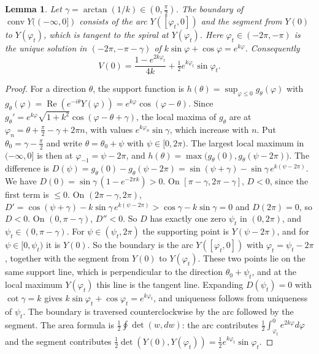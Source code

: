 \documentclass[11pt]{amsart}
\newtheorem{lemma}[theorem]{Lemma}
\theoremstyle{definition}
\newcommand{\conv}{\operatorname{conv}}
\newcommand{\re}{\operatorname{Re}}
\begin{document}
\begin{lemma}\label{lem:spiral}
Let $\gamma=\arctan(1/k)\in(0,\frac\pi2)$. The boundary of $\conv Y((-\infty,0])$ consists of the arc $Y([\varphi_t,0])$ and the segment from $Y(0)$ to $Y(\varphi_t)$, which is
tangent to the spiral at $Y(\varphi_t)$. Here $\varphi_t\in(-2\pi,-\pi)$ is the unique solution in $(-2\pi,-\pi-\gamma)$ of $k\sin\varphi+\cos\varphi=e^{k\varphi}$. Consequently
\[
V(0)=\frac{1-e^{2k\varphi_t}}{4k}+\tfrac12e^{k\varphi_t}\sin\varphi_t .
\]
\end{lemma}
\begin{proof}
For a direction $\theta$, the support function is $h(\theta)=\sup_{\varphi\le0}g_\theta(\varphi)$ with $g_\theta(\varphi)=\re(e^{-i\theta}Y(\varphi))=e^{k\varphi}\cos(\varphi-\theta)$.
Since $g_\theta'=e^{k\varphi}\sqrt{1+k^2}\cos(\varphi-\theta+\gamma)$, the local maxima of $g_\theta$ are at $\varphi_n=\theta+\frac\pi2-\gamma+2\pi n$, with values
$e^{k\varphi_n}\sin\gamma$, which increase with $n$. Put $\theta_0=\gamma-\frac\pi2$ and write $\theta=\theta_0+\psi$ with $\psi\in[0,2\pi)$. The largest local maximum in
$(-\infty,0]$ is then at $\varphi_{-1}=\psi-2\pi$, and $h(\theta)=\max\big(g_\theta(0),g_\theta(\psi-2\pi)\big)$. The difference is
$D(\psi)=g_\theta(0)-g_\theta(\psi-2\pi)=\sin(\psi+\gamma)-\sin\gamma\,e^{k(\psi-2\pi)}$.
We have $D(0)=\sin\gamma\,(1-e^{-2\pi k})>0$. On $[\pi-\gamma,2\pi-\gamma]$, $D<0$, since the first term is $\le0$. On $(2\pi-\gamma,2\pi)$,
$D'=\cos(\psi+\gamma)-k\sin\gamma\,e^{k(\psi-2\pi)}>\cos\gamma-k\sin\gamma=0$ and $D(2\pi)=0$, so $D<0$. On $(0,\pi-\gamma)$, $D''<0$. So $D$ has exactly one zero $\psi_t$ in
$(0,2\pi)$, and $\psi_t\in(0,\pi-\gamma)$.
For $\psi\in(\psi_t,2\pi)$ the supporting point is $Y(\psi-2\pi)$, and for $\psi\in[0,\psi_t)$ it is $Y(0)$. So the boundary is the arc $Y([\varphi_t,0])$ with $\varphi_t=\psi_t-2\pi$,
together with the segment from $Y(0)$ to $Y(\varphi_t)$. These two points lie on the same support line, which is perpendicular to the direction $\theta_0+\psi_t$, and at the local
maximum $Y(\varphi_t)$ this line is the tangent line. Expanding $D(\psi_t)=0$ with $\cot\gamma=k$ gives $k\sin\varphi_t+\cos\varphi_t=e^{k\varphi_t}$, and uniqueness follows from
uniqueness of $\psi_t$. The boundary is traversed counterclockwise by the arc followed by the segment. The area formula is $\frac12\oint\det(w,dw)$: the arc contributes
$\frac12\int_{\varphi_t}^0e^{2k\varphi}d\varphi$ and the segment contributes $\frac12\det(Y(0),Y(\varphi_t))=\frac12e^{k\varphi_t}\sin\varphi_t$.
\end{proof}
\end{document}
